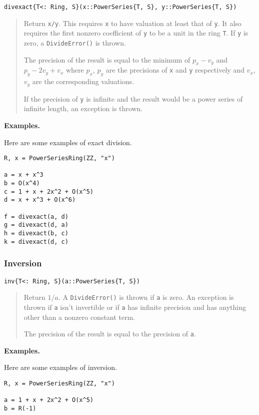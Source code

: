 \documentclass[a4paper,10pt]{article}
\newcommand{\code}{\lstinline}
\newcommand{\desc}[1]{\vspace{-3mm}\begin{quote}#1\end{quote}}
\begin{document}
{{\begin{lstlisting}
divexact{T<: Ring, S}(x::PowerSeries{T, S}, y::PowerSeries{T, S})
\end{lstlisting}

\desc{Return \code{x/y}. This requires \code{x} to have valuation at least that
of \code{y}. It also requires the first nonzero coefficient of \code{y} to be
a unit in the ring \code{T}. If \code{y} is zero, a \code{DivideError()} is
thrown. 

The precision of the result is equal to the minimum of $p_x - v_y$
and $p_y - 2v_y + v_x$ where $p_x$, $p_y$ are the precisions of \code{x} and
\code{y} respectively and $v_x$, $v_y$ are the corresponding valuations.

If the precision of \code{y} is infinite and the result would be a power
series of infinite length, an exception is thrown.}

\textbf{Examples.}

Here are some examples of exact division.

\begin{lstlisting}
R, x = PowerSeriesRing(ZZ, "x")

a = x + x^3
b = O(x^4)
c = 1 + x + 2x^2 + O(x^5)
d = x + x^3 + O(x^6)

f = divexact(a, d)
g = divexact(d, a)
h = divexact(b, c)
k = divexact(d, c)
\end{lstlisting}

\subsubsection{Inversion}

\begin{lstlisting}
inv{T<: Ring, S}(a::PowerSeries{T, S})
\end{lstlisting}

\desc{Return $1/a$. A \code{DivideError()} is thrown if \code{a} is zero. An
exception is thrown if \code{a} isn't invertible or if \code{a} has infinite
precision and has anything other than a nonzero constant term.

The precision of the result is equal to the precision of \code{a}.}

\textbf{Examples.}

Here are some examples of inversion.

\begin{lstlisting}
R, x = PowerSeriesRing(ZZ, "x")

a = 1 + x + 2x^2 + O(x^5)
b = R(-1)


\end{lstlisting}}}
\end{document}
